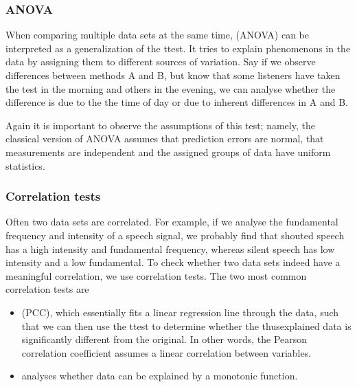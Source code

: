 \documentclass[letterpaper,10pt,english]{jupyterBook}
\begin{document}
\subsubsection{ANOVA}
\label{\detokenize{Evaluation/Analysis_of_evaluation_results:anova}}
\sphinxAtStartPar
When comparing multiple data sets at the same time,  (ANOVA)
can be interpreted as a generalization of the t\sphinxhyphen{}test. It tries to
explain phenomenons in the data by assigning them to different sources
of variation. Say if we observe differences between methods A and B, but
know that some listeners have taken the test in the morning and others
in the evening, we can analyse whether the difference is due to the the
time of day or due to inherent differences in A and B.

\sphinxAtStartPar
Again it is important to observe the assumptions of this test; namely,
the classical version of ANOVA assumes that prediction errors are
normal, that measurements are independent and the assigned groups of
data have uniform statistics.


\subsubsection{Correlation tests}
\label{\detokenize{Evaluation/Analysis_of_evaluation_results:correlation-tests}}
\sphinxAtStartPar
Often two data sets are correlated. For example, if we analyse the
fundamental frequency and intensity of a speech signal, we probably find
that shouted speech has a high intensity and fundamental frequency,
whereas silent speech has low intensity and a low fundamental. To check
whether two data sets indeed have a meaningful correlation, we use
correlation tests. The two most common correlation tests are
\begin{itemize}
\item {} 
\sphinxAtStartPar
{}
(PCC), which essentially fits a linear regression line through the
data, such that we can then use the t\sphinxhyphen{}test to determine whether the
thus\sphinxhyphen{}explained data is significantly different from the original. In
other words, the Pearson correlation coefficient assumes a linear
correlation between variables.

\item {} 
\sphinxAtStartPar
{}
analyses whether data can be explained by a monotonic function.

\end{itemize}
\end{document}
